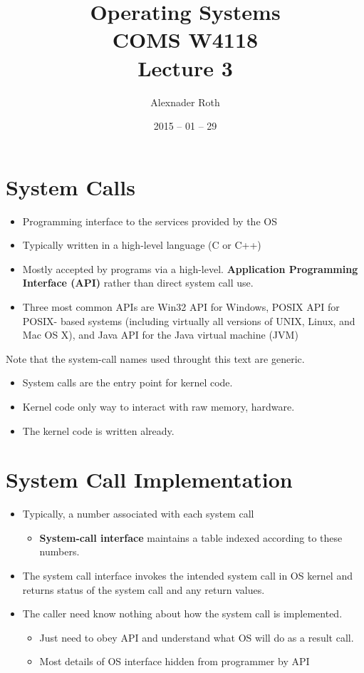 \documentclass[]{article}
\begin{document}
\newtheorem{thm}{Theorem}
\title{Operating Systems \\ COMS W4118 \\ Lecture 3}
\author{Alexnader Roth}
\date{2015 -- 01 -- 29}
\maketitle

\section{System Calls}
\begin{itemize}
\item Programming interface to the services provided by the OS
\item Typically written in a high-level language (C or C++)
\item Mostly accepted by programs via a high-level. \textbf{Application
Programming Interface (API)} rather than direct system call use.
\item Three most common APIs are Win32 API for Windows, POSIX API for POSIX-
based systems (including virtually all versions of UNIX, Linux, and Mac OS X),
and Java API for the Java virtual machine (JVM)
\end{itemize}

Note that the system-call names used throught this text are generic.

\begin{itemize}
\item System calls are the entry point for kernel code.
\item Kernel code only way to interact with raw memory, hardware.
\item The kernel code is written already.
\end{itemize}

\section{System Call Implementation}
\begin{itemize}
\item Typically, a number associated with each system call
\begin{itemize}
\item \textbf{System-call interface} maintains a table indexed according to
these numbers.
\end{itemize}
\item The system call interface invokes the intended system call in OS kernel
and returns status of the system call and any return values.
\item The caller need know nothing about how the system call is implemented.
\begin{itemize}
\item Just need to obey API and understand what OS will do as a result call.
\item Most details of OS interface hidden from programmer by API
\end{itemize}
\end{itemize}
\end{document}
